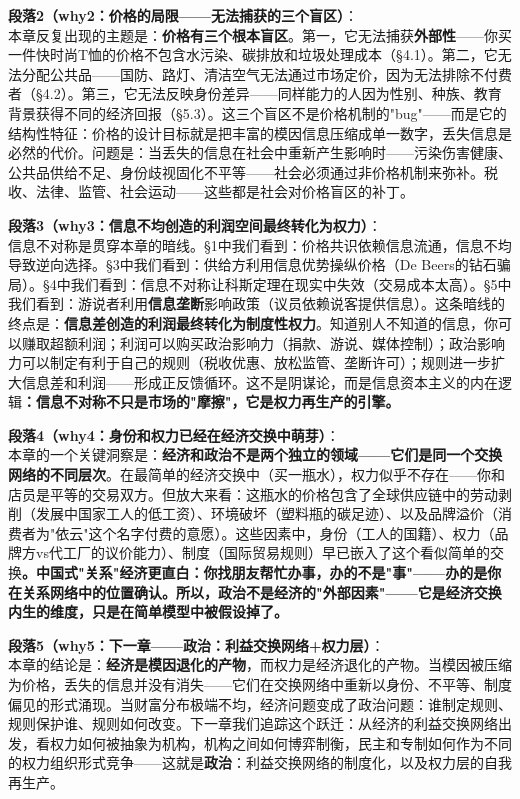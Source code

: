 \documentclass[../main.tex]{subfiles}
\begin{document}
	\textbf{段落2（why2：价格的局限——无法捕获的三个盲区）}：\\
	本章反复出现的主题是：\textbf{价格有三个根本盲区}。第一，它无法捕获\textbf{外部性}——你买一件快时尚T恤的价格不包含水污染、碳排放和垃圾处理成本（§4.1）。第二，它无法分配公共品——国防、路灯、清洁空气无法通过市场定价，因为无法排除不付费者（§4.2）。第三，它无法反映身份差异——同样能力的人因为性别、种族、教育背景获得不同的经济回报（§5.3）。这三个盲区不是价格机制的"bug"——而是它的结构性特征：价格的设计目标就是把丰富的模因信息压缩成单一数字，丢失信息是必然的代价。问题是：当丢失的信息在社会中重新产生影响时——污染伤害健康、公共品供给不足、身份歧视固化不平等——社会必须通过非价格机制来弥补。税收、法律、监管、社会运动——这些都是社会对价格盲区的补丁。

	\textbf{段落3（why3：信息不均创造的利润空间最终转化为权力）}：\\
	信息不对称是贯穿本章的暗线。§1中我们看到：价格共识依赖信息流通，信息不均导致逆向选择。§3中我们看到：供给方利用信息优势操纵价格（De Beers的钻石骗局）。§4中我们看到：信息不对称让科斯定理在现实中失效（交易成本太高）。§5中我们看到：游说者利用\textbf{信息垄断}影响政策（议员依赖说客提供信息）。这条暗线的终点是：\textbf{信息差创造的利润最终转化为制度性权力}。知道别人不知道的信息，你可以赚取超额利润；利润可以购买政治影响力（捐款、游说、媒体控制）；政治影响力可以制定有利于自己的规则（税收优惠、放松监管、垄断许可）；规则进一步扩大信息差和利润——形成正反馈循环。这不是阴谋论，而是信息资本主义的内在逻辑\textbf{：信息不对称不只是市场的"摩擦"，它是权力再生产的引擎。}

	\textbf{段落4（why4：身份和权力已经在经济交换中萌芽）}：\\
	本章的一个关键洞察是：\textbf{经济和政治不是两个独立的领域——它们是同一个交换网络的不同层次}。在最简单的经济交换中（买一瓶水），权力似乎不存在——你和店员是平等的交易双方。但放大来看：这瓶水的价格包含了全球供应链中的劳动剥削（发展中国家工人的低工资）、环境破坏（塑料瓶的碳足迹）、以及品牌溢价（消费者为"依云"这个名字付费的意愿）。这些因素中，身份（工人的国籍）、权力（品牌方vs代工厂的议价能力）、制度（国际贸易规则）早已嵌入了这个看似简单的交换\textbf{。中国式"关系"经济更直白：你找朋友帮忙办事，办的不是"事"——办的是\textbf{你在关系网络中的位置确认}。所以，政治不是经济的"外部因素"——它是经济交换\textbf{内生的维度}，只是在简单模型中被假设掉了。}

	\textbf{段落5（why5：下一章——政治：利益交换网络+权力层）}：\\
	本章的结论是：\textbf{经济是模因退化的产物}，而权力是经济退化的产物。当模因被压缩为价格，丢失的信息并没有消失——它们在交换网络中重新以身份、不平等、制度偏见的形式涌现。当财富分布极端不均，经济问题变成了政治问题：谁制定规则、规则保护谁、规则如何改变。下一章我们追踪这个跃迁：从经济的利益交换网络出发，看权力如何被抽象为机构，机构之间如何博弈制衡，民主和专制如何作为不同的权力组织形式竞争——这就是\textbf{政治}：利益交换网络的制度化，以及权力层的自我再生产。
\end{document}
